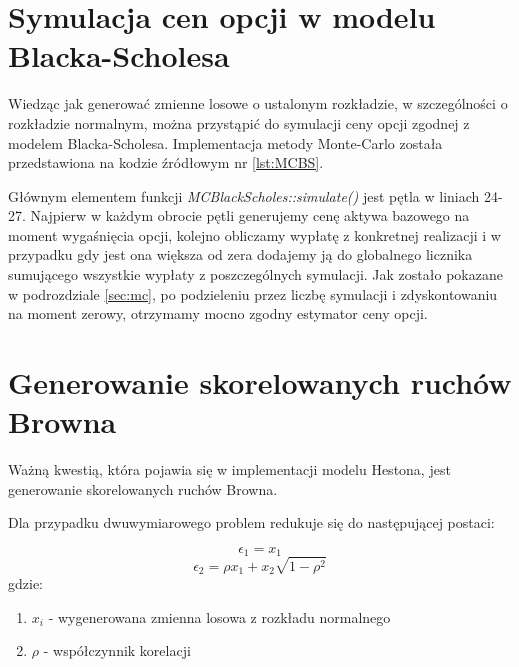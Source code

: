 \documentclass{pracamgr}
\begin{document}
\section{Symulacja cen opcji w modelu Blacka-Scholesa}

Wiedząc jak generować zmienne losowe o ustalonym rozkładzie, w szczególności o rozkładzie normalnym, 
można przystąpić do symulacji ceny opcji zgodnej z modelem Blacka-Scholesa.
Implementacja metody Monte-Carlo została przedstawiona na kodzie źródłowym nr \ref{lst:MCBS}.


 



Głównym elementem funkcji \textit{MCBlackScholes::simulate()} jest pętla w liniach 24-27. 
Najpierw w każdym obrocie pętli generujemy cenę aktywa bazowego na moment wygaśnięcia opcji, kolejno 
obliczamy wypłatę z konkretnej realizacji i w przypadku gdy jest ona większa od zera dodajemy ją do 
globalnego licznika sumującego wszystkie wypłaty z poszczególnych symulacji. Jak zostało pokazane w 
podrozdziale \ref{sec:mc}, po podzieleniu przez liczbę symulacji i zdyskontowaniu na moment zerowy, 
otrzymamy mocno zgodny estymator ceny opcji.

\section{Generowanie skorelowanych ruchów Browna}

Ważną kwestią, która pojawia się w implementacji modelu Hestona, jest generowanie skorelowanych 
ruchów Browna.

Dla przypadku dwuwymiarowego problem redukuje się do 
następującej postaci:

\begin{equation}
  \epsilon_1 = x_1
\end{equation}
\begin{equation}
  \epsilon_2 = \rho x_1 + x_2 \sqrt{1-\rho^2}
\end{equation}
gdzie:
\begin{enumerate}
  \item $x_i$ - wygenerowana zmienna losowa z rozkładu normalnego
  \item $\rho$  - współczynnik korelacji
\end{enumerate}
\end{document}
